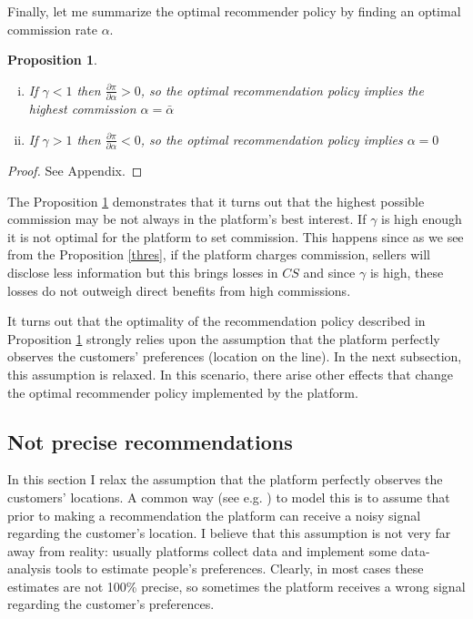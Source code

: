 \documentclass[a4paper]{article}
\newtheorem{proposition}[theorem]{Proposition}
\begin{document}
Finally, let me summarize the optimal recommender policy by finding an optimal commission rate $\alpha$.
\begin{proposition}\label{opt_alpha}
	\begin{enumerate}[(i)]
		\item If $\gamma < 1$ then $\frac{\partial \pi}{\partial \alpha} > 0$, so the optimal recommendation policy implies the highest commission $\alpha = \bar{\alpha}$
		\item If $\gamma > 1$ then $\frac{\partial \pi}{\partial \alpha} < 0$, so the optimal recommendation policy implies $\alpha = 0$
	\end{enumerate}
\end{proposition}
\begin{proof} 
	See Appendix.
\end{proof}

The Proposition \ref{opt_alpha} demonstrates that it turns out that the highest possible commission may be not always in the platform's best interest. If $\gamma$ is high enough it is not optimal for the platform to set commission. This happens since as we see from the Proposition \ref{thres}, if the platform charges commission, sellers will disclose less information but this brings losses in $CS$ and since $\gamma$ is high, these losses do not outweigh direct benefits from high commissions. 






It turns out that the optimality of the recommendation policy described in Proposition \ref{opt_alpha} strongly relies upon the assumption that the platform perfectly observes the customers' preferences (location on the line). In the next subsection, this assumption is relaxed. In this scenario, there arise other effects that change the optimal recommender policy implemented by the platform.

\subsection{Not precise recommendations}
In this section I relax the assumption that the platform perfectly observes the customers' locations. A common way (see e.g. \cite{lewis1994supplying} ) to model this is to assume that prior to making a recommendation the platform can receive a noisy signal regarding the customer's location. I believe that this assumption is not very far away from reality: usually platforms collect data and implement some data-analysis tools to estimate people's preferences. Clearly, in most cases these estimates are not 100\% precise, so sometimes the platform receives a wrong signal regarding the customer's preferences.
\end{document}
